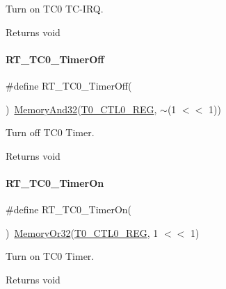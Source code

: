 Turn on T\+C0 T\+C-\/\+I\+RQ. 

\begin{DoxyReturn}{Returns}
void 
\end{DoxyReturn}
\mbox{\label{a00041_acbfad29faf802168f3281e5754e40aa9}} 
\paragraph{\texorpdfstring{R\+T\+\_\+\+T\+C0\+\_\+\+Timer\+Off}{RT\_TC0\_TimerOff}}
{\footnotesize\ttfamily \#define R\+T\+\_\+\+T\+C0\+\_\+\+Timer\+Off(\begin{DoxyParamCaption}{ }\end{DoxyParamCaption})~\mbox{\hyperlink{a00020_ad87cedffcaadc51db22594fce55173d4}{Memory\+And32}}(\mbox{\hyperlink{a00020_ac94b0659ef32086a6752672082c0b3ed}{T0\+\_\+\+C\+T\+L0\+\_\+\+R\+EG}}, $\sim$(1 $<$$<$ 1))}



Turn off T\+C0 Timer. 

\begin{DoxyReturn}{Returns}
void 
\end{DoxyReturn}
\mbox{\label{a00041_aa7936fffa8b7bcd47751d2e89f81d4a9}} 
\paragraph{\texorpdfstring{R\+T\+\_\+\+T\+C0\+\_\+\+Timer\+On}{RT\_TC0\_TimerOn}}
{\footnotesize\ttfamily \#define R\+T\+\_\+\+T\+C0\+\_\+\+Timer\+On(\begin{DoxyParamCaption}{ }\end{DoxyParamCaption})~\mbox{\hyperlink{a00020_a27874a97deab7cecdde5ddecf466e31e}{Memory\+Or32}}(\mbox{\hyperlink{a00020_ac94b0659ef32086a6752672082c0b3ed}{T0\+\_\+\+C\+T\+L0\+\_\+\+R\+EG}}, 1 $<$$<$ 1)}



Turn on T\+C0 Timer. 

\begin{DoxyReturn}{Returns}
void 
\end{DoxyReturn}
\mbox{\label{a00041_af8994aa8faed7529c93c25df30c020eb}} 
